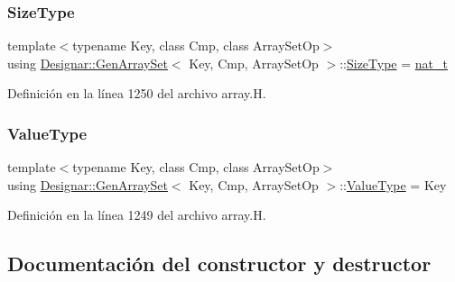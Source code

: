\subsubsection{\texorpdfstring{Size\+Type}{SizeType}}
{\footnotesize\ttfamily template$<$typename Key, class Cmp, class Array\+Set\+Op$>$ \\
using \hyperlink{class_designar_1_1_gen_array_set}{Designar\+::\+Gen\+Array\+Set}$<$ Key, Cmp, Array\+Set\+Op $>$\+::\hyperlink{class_designar_1_1_gen_array_set_aabe7047d492721160f291bf40ecf7745}{Size\+Type} =  \hyperlink{namespace_designar_aa72662848b9f4815e7bf31a7cf3e33d1}{nat\+\_\+t}}



Definición en la línea 1250 del archivo array.\+H.

\mbox{\label{class_designar_1_1_gen_array_set_aef777cbce261e3d5df5f03c632a7c8c2}} 
\subsubsection{\texorpdfstring{Value\+Type}{ValueType}}
{\footnotesize\ttfamily template$<$typename Key, class Cmp, class Array\+Set\+Op$>$ \\
using \hyperlink{class_designar_1_1_gen_array_set}{Designar\+::\+Gen\+Array\+Set}$<$ Key, Cmp, Array\+Set\+Op $>$\+::\hyperlink{class_designar_1_1_gen_array_set_aef777cbce261e3d5df5f03c632a7c8c2}{Value\+Type} =  Key}



Definición en la línea 1249 del archivo array.\+H.



\subsection{Documentación del constructor y destructor}
\mbox{\label{class_designar_1_1_gen_array_set_a51b519b8c338a8f0e4db3d50e77bfd6f}} 
